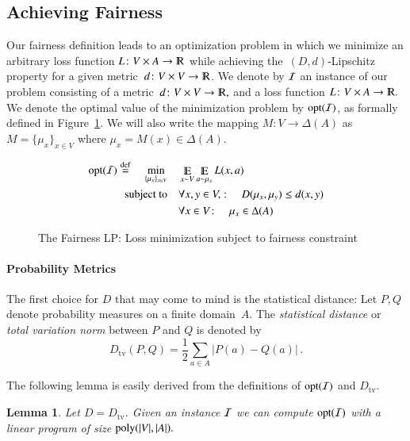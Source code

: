 \documentclass[letterpaper,11pt]{article}
\newcommand{\authnote}[2]{{ \footnotesize \bf{\color{red}[#1's Note: {\color{blue}#2}]}}}
\newcommand{\authnote}[2]{}
\newtheorem{lemma}[theorem]{Lemma}%
\theoremstyle{definition}
\newcommand{\poly}{{\rm poly}}
\renewcommand{\mathbb}{\varmathbb}
\newcommand{\Esymb}{\mathbb{E}}
\DeclareMathOperator*{\E}{\Esymb}
\newcommand{\mper}{\,.}
\newcommand{\cnote}[1]{{\authnote{Cynthia} {#1}}}
\newcommand{\R}{\mathbb{R}}
\newcommand{\cI}{{\cal I}}
\newcommand{\defeq}{\stackrel{\small \mathrm{def}}{=}}
\newcommand{\opt}{\mathrm{opt}}
\newcommand{\tv}{\mathrm{tv}}
\newcommand\dtoD{D,d}
\begin{document}
\subsection{Achieving Fairness}
\label{sec:achieving}
 Our fairness definition leads to an optimization problem in which we minimize
an arbitrary loss function $L\colon V\times A\to\mathbb{R}$ while achieving
the~$(\dtoD)$-Lipschitz property for a given metric~$d\colon V\times V\to\R$.
We denote by $\cI$ an instance of our problem consisting
of a metric~$d\colon V\times V\to\R,$ and a loss function $L\colon V\times
A\to\R.$
We denote the optimal value of the minimization problem by $\mathrm{opt}(\cI)$,
as formally defined in Figure~\ref{fig:opt}. We will also write the mapping $M\colon V\to\Delta(A)$ as
$M=\{\mu_x\}_{x\in V}$ where $\mu_x=M(x)\in\Delta(A).$

\begin{figure}[h]
\begin{align} \label{eq:fairness-lp}
\mathrm{opt}(\cI)\defeq\quad\min_{\{\mu_x\}_{x\in V}}\quad
& \E_{x\sim V}\E_{a\sim\mu_x} L(x,a)  \\
\text{subject to}\quad
&\forall x,y\in V,\colon\quad
D(\mu_x,\mu_y) \le d(x,y)
\label{eq:lip-c}\\
& \forall x\in V\colon\quad\mu_x\in \Delta(A)
\end{align}
\caption{The Fairness LP: Loss minimization subject to fairness constraint}
\label{fig:opt}
\end{figure}

\paragraph{Probability Metrics}
The first choice for $D$ that may come to mind is the statistical distance:
%
Let $P,Q$ denote probability measures on a finite domain~$A.$ The
\emph{statistical distance} or \emph{total variation norm} between $P$ and $Q$
is denoted by
\begin{equation}\label{eq:tvnorm}
D_\tv(P,Q)=\frac12\sum_{a\in A}|P(a)-Q(a)|\mper
\end{equation}
%

The following lemma is easily derived from the definitions of $\opt(\cI)$ and $D_\tv$.
\begin{lemma}\label{lem:opt}
Let $D = D_\tv$.
Given an instance $\cI$ we can compute $\opt(\cI)$
with a linear program of size $\poly(|V|,|A|).$
\end{lemma}
\end{document}

